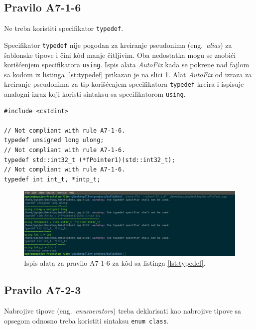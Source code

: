 \documentclass[12pt,oneside]{memoir}
\begin{document}
\subsection{Pravilo A7-1-6}
\begin{center}
\begin{tcolorbox}
Ne treba koristiti specifikator \texttt{typedef}. 
\end{tcolorbox}
\end{center}

Specifikator \texttt{typedef} nije pogodan za kreiranje pseudonima (eng.~\textit{alias}) za \v{s}ablonske tipove i \v{c}ini k\^{o}d manje \v{c}itljivim.
Oba nedostatka mogu se zaobi\'{c}i kori\v{s}\'{c}enjem specifikatora \texttt{using}.  Ispis alata \textit{AutoFix} kada se pokrene nad fajlom sa kodom iz listinga \ref{lst:typedef} prikazan je na slici \ref{fig:A7-1-6}. Alat \textit{AutoFix} od izraza za kreiranje pseudonima za tip kori\v{s}\'{c}enjem
specifikatora \texttt{typedef} kreira i ispisuje analogni izraz koji koristi sintaksu sa specifikatorom \texttt{using}.

\begin{lstlisting}[style=customc, caption={Primer koda koji nije napisan u skladu sa pravilom \textbf{A7-1-6}, odnosno koristi specifikator \texttt{typedef}.}, label=lst:typedef]
#include <cstdint>

// Not compliant with rule A7-1-6.
typedef unsigned long ulong;
// Not compliant with rule A7-1-6.
typedef std::int32_t (*fPointer1)(std::int32_t);
// Not compliant with rule A7-1-6.
typedef int int_t, *intp_t;

\end{lstlisting}

\begin{figure}[!h]
\begin{center}
\includegraphics[scale=0.3]{A7_1_6.png}
\end{center}
\caption{Ispis alata za pravilo A7-1-6 za k\^{o}d sa listinga \ref{lst:typedef}.}
\label{fig:A7-1-6}
\end{figure}


\subsection{Pravilo A7-2-3}
\begin{center}
\begin{tcolorbox}
Nabrojive tipove (eng.~\textit{enumerators}) treba deklarisati kao nabrojive tipove sa opsegom odnosno treba koristiti sintaksu \texttt{enum class}.
\end{tcolorbox}
\end{center}
\end{document}

